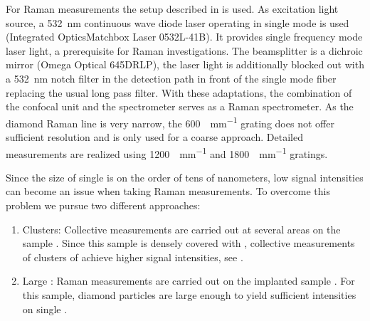 			For Raman measurements the setup described in  is used.
			As excitation light source, a \SI{532}{nm} continuous wave diode laser operating in single mode is used (Integrated Optics\textregistered Matchbox Laser 0532L-41B).
			It provides single frequency mode laser light, a prerequisite for Raman investigations.
			The beamsplitter is a dichroic mirror (Omega Optical 645DRLP), the laser light is additionally blocked out with a \SI{532}{\nm} notch filter in the detection path in front of the single mode fiber replacing the usual long pass filter.
			With these adaptations, the combination of the confocal unit and the spectrometer serves as a Raman spectrometer.
			As the diamond Raman line is very narrow, the \SI[per-mode=symbol]{600}{\lines\per\mm} grating does not offer sufficient resolution and is only used for a coarse approach. Detailed measurements are realized using \SI[per-mode=symbol]{1200}{\lines\per\mm} and \SI[per-mode=symbol]{1800}{\lines\per\mm} gratings.
			
			Since the size of single \nds is on the order of tens of nanometers, low signal intensities can become an issue when taking Raman measurements.
			To overcome this problem we pursue two different approaches:
			\begin{enumerate}[label=\alph*),ref=\alph*)]
				\item \Nd Clusters: \label{item::raman_gband} Collective measurements are carried out at several areas on the sample \insituS. Since this sample is densely covered with \nds, collective measurements of clusters of \nds achieve higher signal intensities, see .
				\item Large \Nds: \label{item::raman_implanted} Raman measurements are carried out on the implanted sample \implantedTao. For this sample, diamond particles are large enough to yield sufficient intensities on single \nds.
			\end{enumerate}

